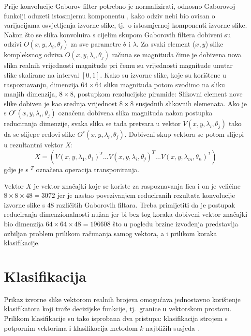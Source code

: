 \documentclass{ru}
\begin{document}
Prije konvolucije Gaborov filter potrebno je normalizirati, odnosno Gaborovoj
funkciji oduzeti istosmjernu komponentu , kako odziv nebi bio
ovisan o varijacijama osvjetljenja izvorne slike, tj.~o istosmjernoj komponenti
izvorne slike. Nakon što se slika konvoluira s cijelim skupom Gaborovih filtera
dobiveni su odzivi $O(x,y,\lambda_i, \theta_j)$ za sve parametre $\theta$ i
$\lambda$. Za svaki element ($x,y$) slike kompleksnog odziva $O(x,y,\lambda_i,
\theta_j)$ računa se magnituda čime je dobivena nova slika realnih vrijednosti
magnitude pri čemu su vrijednosti magnitude unutar slike skalirane na interval
$[0, 1]$. Kako su izvorne slike, koje su korištene u raspoznavanju, dimenzija
$64\times64$ sliku magnituda potom svodimo na sliku manjih dimenzija, $8\times8$,
postupkom rezolucijske piramide: Slikovni element nove slike dobiven je
kao srednja vrijednost $8\times8$ susjednih slikovnih elemenata. Ako je s
$O^{r}(x,y,\lambda_i, \theta_j)$ označena dobivena slika magnituda nakon postupka
reduciranja dimenzije, svaka slika se tada pretvara u vektor $V(x,y,\lambda_i,
\theta_j)$ tako da se slijepe  redovi slike
$O^{r}(x,y,\lambda_i, \theta_j)$. Dobiveni skup vektora se potom slijepi u
rezultantni vektor $X$:
\begin{equation}
 X = \left ( V(x,y,\lambda_1, \theta_1)^T \ldots
V(x,y,\lambda_i, \theta_j)^T \ldots V(x,y,\lambda_m, \theta_n)^T \right )
\end{equation}
gdje je s $^T$ označena operacija transponiranja.

Vektor $X$ je vektor značajki koje se koriste za raspoznavanja lica i on
je veličine $8\times8\times48 = 3072$  jer je nastao povezivanjem reduciranih
rezultata konvolucije izvorne slike s $48$ različitih Gaborovih filtara. Treba
primijetiti da je postupak reduciranja dimenzionalnosti nužan jer bi bez tog koraka
dobiveni vektor značajki bio dimenzija $64\times64\times48 = 196608$ što u
pogledu brzine izvođenja predstavlja ozbiljan problem prilikom računanja samog
vektora, a i prilikom koraka klasifikacije.




\chapter{Klasifikacija}

Prikaz izvorne slike vektorom realnih brojeva omogućava jednostavno korištenje
klasifikatora koji traže decizijske funkcije, tj.~granice u vektorskom prostoru.
Prilikom klasifikacije su tako isprobana dva pristupa: klasifikacija strojem s
potpornim vektorima  i klasifikacija metodom
$k$-najbližih susjeda .
\end{document}
